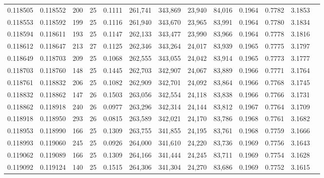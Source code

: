 \begin{tabular}{rrrrrrrrrrrrr}
0.118505 & 0.118552 & 200 &  25 &                                     0.1111 & 261,741 & 343,869 &  23,940 &  84,016 & 0.1964 & 0.7782 & 3.1853 \\
0.118553 & 0.118592 & 199 &  25 &                                     0.1116 & 261,940 & 343,670 &  23,965 &  83,991 & 0.1964 & 0.7780 & 3.1834 \\
0.118594 & 0.118611 & 193 &  25 &                                     0.1147 & 262,133 & 343,477 &  23,990 &  83,966 & 0.1964 & 0.7778 & 3.1816 \\
0.118612 & 0.118647 & 213 &  27 &                                     0.1125 & 262,346 & 343,264 &  24,017 &  83,939 & 0.1965 & 0.7775 & 3.1797 \\
0.118649 & 0.118703 & 209 &  25 &                                     0.1068 & 262,555 & 343,055 &  24,042 &  83,914 & 0.1965 & 0.7773 & 3.1777 \\
0.118703 & 0.118760 & 148 &  25 &                                     0.1445 & 262,703 & 342,907 &  24,067 &  83,889 & 0.1966 & 0.7771 & 3.1764 \\
0.118761 & 0.118832 & 206 &  25 &                                     0.1082 & 262,909 & 342,701 &  24,092 &  83,864 & 0.1966 & 0.7768 & 3.1745 \\
0.118832 & 0.118862 & 147 &  26 &                                     0.1503 & 263,056 & 342,554 &  24,118 &  83,838 & 0.1966 & 0.7766 & 3.1731 \\
0.118862 & 0.118918 & 240 &  26 &                                     0.0977 & 263,296 & 342,314 &  24,144 &  83,812 & 0.1967 & 0.7764 & 3.1709 \\
0.118918 & 0.118950 & 293 &  26 &                                     0.0815 & 263,589 & 342,021 &  24,170 &  83,786 & 0.1968 & 0.7761 & 3.1682 \\
0.118953 & 0.118990 & 166 &  25 &                                     0.1309 & 263,755 & 341,855 &  24,195 &  83,761 & 0.1968 & 0.7759 & 3.1666 \\
0.118993 & 0.119060 & 245 &  25 &                                     0.0926 & 264,000 & 341,610 &  24,220 &  83,736 & 0.1969 & 0.7756 & 3.1643 \\
0.119062 & 0.119089 & 166 &  25 &                                     0.1309 & 264,166 & 341,444 &  24,245 &  83,711 & 0.1969 & 0.7754 & 3.1628 \\
0.119092 & 0.119124 & 140 &  25 &                                     0.1515 & 264,306 & 341,304 &  24,270 &  83,686 & 0.1969 & 0.7752 & 3.1615 \\

\end{tabular}
